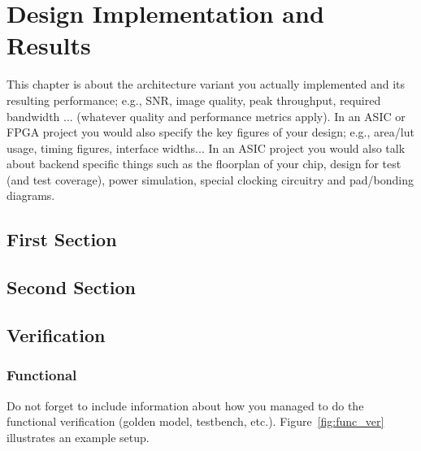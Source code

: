

\chapter{Design Implementation and Results}
This chapter is about the architecture variant you actually
implemented and its resulting performance; e.g., SNR, image quality,
peak throughput, required bandwidth ... (whatever quality and
performance metrics apply). In an ASIC or FPGA project you would also
specify the key figures of your design; e.g., area/lut usage, timing
figures, interface widths... In an ASIC project you would also talk
about backend specific things such as the floorplan of your chip,
design for test (and test coverage), power simulation, special
clocking circuitry and pad/bonding diagrams.

\section{First Section}


\section{Second Section}

\section{Verification}

\subsection{Functional}
Do not forget to include information about how you managed to do the
functional verification (golden model, testbench,
etc.). Figure~\ref{fig:func_ver} illustrates an example setup.


